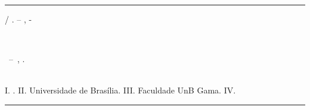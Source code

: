 \begin{fichacatalografica}
	\vspace*{\fill}					%
	\hrule							%
	\begin{center}					%
	\begin{minipage}[c]{12.5cm}		%

	\imprimirautor

	\hspace{0.5cm} \imprimirtitulo  / \imprimirautor. --
	\imprimirlocal, \imprimirdata-


	\hspace{0.5cm} \imprimirorientadorRotulo~\imprimirorientador\\

	\hspace{0.5cm}
	\parbox[t]{\textwidth}{\imprimirtipotrabalho~--~\imprimirinstituicao,
	\imprimirdata.}\\

	\hspace{0.5cm}
		I. \imprimirorientador.
		II. Universidade de Brasília.
		III. Faculdade UnB Gama.
		IV. \imprimirtitulo\\


	\end{minipage}
	\end{center}
	\hrule
\end{fichacatalografica}

